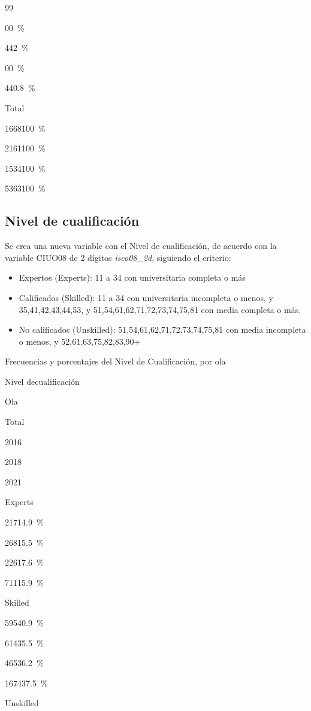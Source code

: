 \documentclass[
  12pt,
]{book}
\providecommand{\tightlist}{%
  \setlength{\itemsep}{0pt}\setlength{\parskip}{0pt}}
\begin{document}
99

{0}{0~\%}

{44}{2~\%}

{0}{0~\%}

{44}{0.8~\%}

Total

{1668}{100~\%}

{2161}{100~\%}

{1534}{100~\%}

{5363}{100~\%}

\hypertarget{nivel-de-cualificaciuxf3n}{%
\subsection{Nivel de cualificación}\label{nivel-de-cualificaciuxf3n}}

Se crea una nueva variable con el Nivel de cualificación, de acuerdo con la variable CIUO08 de 2 dígitos \emph{isco08\_2d}, siguiendo el criterio:

\begin{itemize}
\tightlist
\item
  Expertos (Experts): 11 a 34 con universitaria completa o más
\item
  Calificados (Skilled): 11 a 34 con universitaria incompleta o menos, y 35,41,42,43,44,53, y 51,54,61,62,71,72,73,74,75,81 con media completa o más.
\item
  No calificados (Unskilled): 51,54,61,62,71,72,73,74,75,81 con media incompleta o menos, y 52,61,63,75,82,83,90+
\end{itemize}

Frecuencias y porcentajes del Nivel de Cualificación, por ola

Nivel decualificación

Ola

Total

2016

2018

2021

Experts

{217}{14.9~\%}

{268}{15.5~\%}

{226}{17.6~\%}

{711}{15.9~\%}

Skilled

{595}{40.9~\%}

{614}{35.5~\%}

{465}{36.2~\%}

{1674}{37.5~\%}

Unskilled
\end{document}
